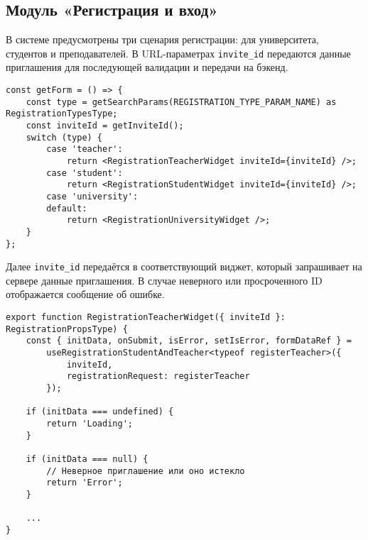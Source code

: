 \subsection{Модуль «Регистрация и вход»}
В системе предусмотрены три сценария регистрации: для университета, студентов и преподавателей. В URL-параметрах \texttt{invite\_id} передаются данные приглашения для последующей валидации и передачи на бэкенд.

\begin{lstlisting}[caption={Выбор виджета регистрации}]
const getForm = () => {
    const type = getSearchParams(REGISTRATION_TYPE_PARAM_NAME) as RegistrationTypesType;
    const inviteId = getInviteId();
    switch (type) {
        case 'teacher':
            return <RegistrationTeacherWidget inviteId={inviteId} />;
        case 'student':
            return <RegistrationStudentWidget inviteId={inviteId} />;
        case 'university':
        default:
            return <RegistrationUniversityWidget />;
    }
};
\end{lstlisting}

Далее \texttt{invite\_id} передаётся в соответствующий виджет, который запрашивает на сервере данные приглашения. В случае неверного или просроченного ID отображается сообщение об ошибке.

\begin{lstlisting}[caption={RegistrationTeacherWidget}]
export function RegistrationTeacherWidget({ inviteId }: RegistrationPropsType) {
    const { initData, onSubmit, isError, setIsError, formDataRef } =
        useRegistrationStudentAndTeacher<typeof registerTeacher>({
            inviteId,
            registrationRequest: registerTeacher
        });

    if (initData === undefined) {
        return 'Loading';
    }

    if (initData === null) {
        // Неверное приглашение или оно истекло
        return 'Error';
    }

	...
}
\end{lstlisting}

